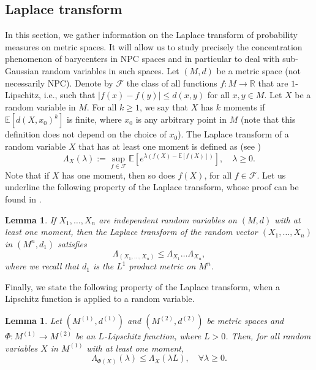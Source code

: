 \documentclass[10pt,a4paper]{article}
\theoremstyle{plain}
\newtheorem{lemma}[theorem]{Lemma}
\theoremstyle{definition}
\theoremstyle{remark}
\newcommand{\R}{\mathbb{R}}
\newcommand{\E}{\mathbb{E}}
\begin{document}
\subsection{Laplace transform}
In this section, we gather information on the Laplace transform of probability measures on metric spaces. It will allow us to study precisely the concentration phenomenon of barycenters in NPC spaces and in particular to deal with sub-Gaussian random variables in such spaces.
Let $(M,d)$ be a metric space (not necessarily NPC). Denote by $\mathcal F$ the class of all functions $f:M\to\R$ that are $1$-Lipschitz, i.e., such that $|f(x)-f(y)|\leq d(x,y)$ for all $x,y\in M$. Let $X$ be a random variable in $M$. For all $k\geq 1$, we say that $X$ has $k$ moments if $\E[d(X,x_0)^k]$ is finite, where $x_0$ is any arbitrary point in $M$ (note that this definition does not depend on the choice of $x_0$). The Laplace transform of a random variable $X$ that has at least one moment is defined as (see \cite[Section 1.6]{Ledouxconcentration})
\begin{equation}\label{eq:defLaplace}
\Lambda_X(\lambda) := \sup_{f\in \mathcal F} \E[e^{\lambda(f(X)-\E[f(X)])}], \quad \lambda\geq 0.
\end{equation}
Note that if $X$ has one moment, then so does $f(X)$, for all $f\in\mathcal F$. Let us underline the following property of the Laplace transform, whose proof can be found in \cite[Proposition 1.15]{Ledouxconcentration}.

\begin{lemma}\label{produitdelaplace}
If $X_1,\ldots,X_n$ are independent random variables on $(M,d)$ with at least one moment, then the Laplace transform of the random vector $(X_1,\ldots,X_n)$ in $(M^n,d_1)$  satisfies $$\Lambda_{(X_1,\ldots,X_n)} \leq \Lambda_{X_1}\ldots \Lambda_{X_n},$$ where we recall that $d_1$ is the $L^1$ product metric on $M^n$.
\end{lemma}

Finally, we state the following property of the Laplace transform, when a Lipschitz function is applied to a random variable.

\begin{lemma} \label{lemma:LipLap}
    Let $(M^{(1)},d^{(1)})$ and $(M^{(2)},d^{(2)})$ be metric spaces and $\Phi:M^{(1)}\to M^{(2)}$ be an $L$-Lipschitz function, where $L>0$. Then, for all random variables $X$ in $M^{(1)}$ with at least one moment,
    $$\Lambda_{\Phi(X)}(\lambda)\leq \Lambda_X(\lambda L), \quad \forall \lambda\geq 0.$$
\end{lemma}
\end{document}
